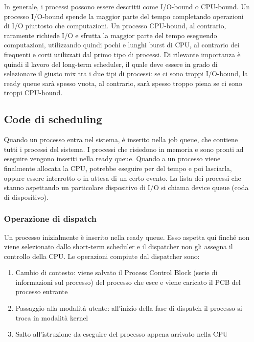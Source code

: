 \documentclass[a4paper]{article}
\begin{document}
In generale, i processi possono essere descritti come I/O-bound o CPU-bound. Un processo I/O-bound spende la maggior parte del tempo completando operazioni di I/O piuttosto che computazioni. Un processo CPU-bound, al contrario, raramente richiede I/O e sfrutta la maggior parte del tempo eseguendo computazioni, utilizzando quindi pochi e lunghi burst di CPU, al contrario dei frequenti e corti utilizzati dal primo tipo di processi. Di rilevante importanza è quindi il lavoro del long-term scheduler, il quale deve essere in grado di selezionare il giusto mix tra i due tipi di processi: se ci sono troppi I/O-bound, la ready queue sarà spesso vuota, al contrario, sarà spesso troppo piena se ci sono troppi CPU-bound.

\subsection{Code di scheduling}
Quando un processo entra nel sistema, è inserito nella job queue, che contiene tutti i processi del sistema. I processi che risiedono in memoria e sono pronti ad eseguire vengono inseriti nella ready queue. Quando a un processo viene finalmente allocata la CPU, potrebbe eseguire per del tempo e poi lasciarla, oppure essere interrotto o in attesa di un certo evento. La lista dei processi che stanno aspettando un particolare dispositivo di I/O si chiama device queue (coda di dispositivo).
\subsubsection{Operazione di dispatch}
Un processo inizialmente è inserito nella ready queue. Esso aspetta qui finché non viene selezionato dallo short-term scheduler e il dispatcher non gli assegna il controllo della CPU. Le operazioni compiute dal dispatcher sono:
\begin{enumerate}
   \item Cambio di contesto: viene salvato il Process Control Block (serie di informazioni sul processo) del processo che esce e viene caricato il PCB del processo entrante
   \item Passaggio alla modalità utente: all'inizio della fase di dispatch il processo si troca in modalità kernel
   \item Salto all'istruzione da eseguire del processo appena arrivato nella CPU
\end{enumerate}
\end{document}

